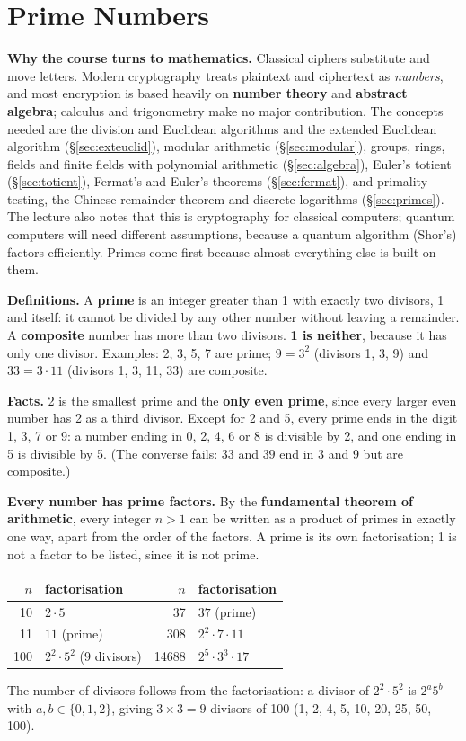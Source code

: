 \section{Prime Numbers}\label{sec:primesintro}
\textbf{Why the course turns to mathematics.} Classical ciphers substitute and move letters. Modern cryptography treats plaintext and ciphertext as \emph{numbers}, and most encryption is based heavily on \textbf{number theory} and \textbf{abstract algebra}; calculus and trigonometry make no major contribution. The concepts needed are the division and Euclidean algorithms and the extended Euclidean algorithm (\S\ref{sec:exteuclid}), modular arithmetic (\S\ref{sec:modular}), groups, rings, fields and finite fields with polynomial arithmetic (\S\ref{sec:algebra}), Euler's totient (\S\ref{sec:totient}), Fermat's and Euler's theorems (\S\ref{sec:fermat}), and primality testing, the Chinese remainder theorem and discrete logarithms (\S\ref{sec:primes}). The lecture also notes that this is cryptography for classical computers; quantum computers will need different assumptions, because a quantum algorithm (Shor's) factors efficiently. Primes come first because almost everything else is built on them.

\textbf{Definitions.} A \textbf{prime} is an integer greater than 1 with exactly two divisors, 1 and itself: it cannot be divided by any other number without leaving a remainder. A \textbf{composite} number has more than two divisors. \textbf{1 is neither}, because it has only one divisor. Examples: 2, 3, 5, 7 are prime; $9 = 3^2$ (divisors 1, 3, 9) and $33 = 3 \cdot 11$ (divisors 1, 3, 11, 33) are composite.

\textbf{Facts.} 2 is the smallest prime and the \textbf{only even prime}, since every larger even number has 2 as a third divisor. Except for 2 and 5, every prime ends in the digit 1, 3, 7 or 9: a number ending in 0, 2, 4, 6 or 8 is divisible by 2, and one ending in 5 is divisible by 5. (The converse fails: $33$ and $39$ end in 3 and 9 but are composite.)

\textbf{Every number has prime factors.} By the \textbf{fundamental theorem of arithmetic}, every integer $n > 1$ can be written as a product of primes in exactly one way, apart from the order of the factors. A prime is its own factorisation; 1 is not a factor to be listed, since it is not prime.
\begin{center}\small
\begin{tabular}{@{}rl@{\qquad}rl@{}}
\toprule
$n$ & factorisation & $n$ & factorisation\\
\midrule
10 & $2 \cdot 5$ & 37 & $37$ (prime)\\
11 & $11$ (prime) & 308 & $2^2 \cdot 7 \cdot 11$\\
100 & $2^2 \cdot 5^2$ (9 divisors) & 14688 & $2^5 \cdot 3^3 \cdot 17$\\
\bottomrule
\end{tabular}
\end{center}
The number of divisors follows from the factorisation: a divisor of $2^2 \cdot 5^2$ is $2^a 5^b$ with $a, b \in \{0, 1, 2\}$, giving $3 \times 3 = 9$ divisors of 100 (1, 2, 4, 5, 10, 20, 25, 50, 100).

